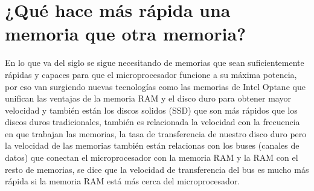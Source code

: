 \documentclass{article}
\begin{document}
	\section{¿Qué hace más rápida una memoria que otra memoria?}
	En lo que va del siglo se sigue necesitando de memorias que sean suficientemente rápidas y capaces para que el microprocesador funcione a su máxima potencia, por eso van surgiendo nuevas tecnologías como las memorias de Intel Optane que unifican las ventajas de la memoria RAM y el disco duro para obtener mayor velocidad y también están los discos solidos (SSD) que son más rápidos que los discos duros tradicionales, también es relacionada la velocidad con la frecuencia en que trabajan las memorias, la tasa de transferencia de nuestro disco duro pero la velocidad de las memorias también están relacionas con los buses (canales de datos) que conectan el microprocesador con la memoria RAM y la RAM con el resto de memorias, se dice que la velocidad de transferencia del bus es mucho más rápida si la memoria RAM está más cerca del microprocesador.
	
	
\end{document}
